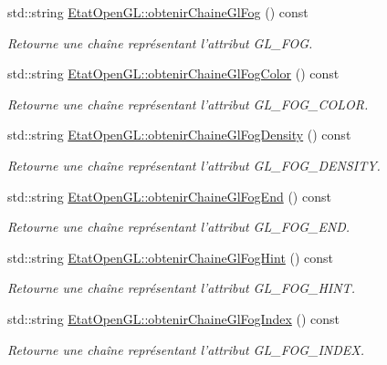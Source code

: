 \begin{DoxyCompactItemize}
std\-::string \hyperlink{group__utilitaire_ga73b3d82b8c3940a818e1dab3d69e4899}{Etat\-Open\-G\-L\-::obtenir\-Chaine\-Gl\-Fog} () const 
\begin{DoxyCompactList}\small\item\em Retourne une chaîne représentant l'attribut G\-L\-\_\-\-F\-O\-G. \end{DoxyCompactList}\item 
std\-::string \hyperlink{group__utilitaire_ga572f199118c8cb77085a7eb21f05f7fb}{Etat\-Open\-G\-L\-::obtenir\-Chaine\-Gl\-Fog\-Color} () const 
\begin{DoxyCompactList}\small\item\em Retourne une chaîne représentant l'attribut G\-L\-\_\-\-F\-O\-G\-\_\-\-C\-O\-L\-O\-R. \end{DoxyCompactList}\item 
std\-::string \hyperlink{group__utilitaire_ga9ad8c1de41bc053666ffe001bca8f064}{Etat\-Open\-G\-L\-::obtenir\-Chaine\-Gl\-Fog\-Density} () const 
\begin{DoxyCompactList}\small\item\em Retourne une chaîne représentant l'attribut G\-L\-\_\-\-F\-O\-G\-\_\-\-D\-E\-N\-S\-I\-T\-Y. \end{DoxyCompactList}\item 
std\-::string \hyperlink{group__utilitaire_ga9c6edbc286eed9a47b2e3ed2426e2b92}{Etat\-Open\-G\-L\-::obtenir\-Chaine\-Gl\-Fog\-End} () const 
\begin{DoxyCompactList}\small\item\em Retourne une chaîne représentant l'attribut G\-L\-\_\-\-F\-O\-G\-\_\-\-E\-N\-D. \end{DoxyCompactList}\item 
std\-::string \hyperlink{group__utilitaire_ga8bd30ecaffe9f7d38e7a447a185dc8d0}{Etat\-Open\-G\-L\-::obtenir\-Chaine\-Gl\-Fog\-Hint} () const 
\begin{DoxyCompactList}\small\item\em Retourne une chaîne représentant l'attribut G\-L\-\_\-\-F\-O\-G\-\_\-\-H\-I\-N\-T. \end{DoxyCompactList}\item 
std\-::string \hyperlink{group__utilitaire_ga929e0d580e014af6abda36f16fce43c3}{Etat\-Open\-G\-L\-::obtenir\-Chaine\-Gl\-Fog\-Index} () const 
\begin{DoxyCompactList}\small\item\em Retourne une chaîne représentant l'attribut G\-L\-\_\-\-F\-O\-G\-\_\-\-I\-N\-D\-E\-X. \end{DoxyCompactList}\item 

\end{DoxyCompactItemize}
